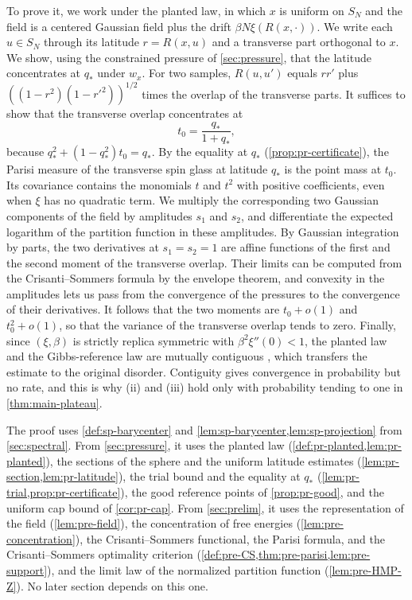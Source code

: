 To prove it, we work under the planted law, in which $x$ is uniform on $S_N$ and the field is a centered Gaussian field plus the drift $\beta N\xi(R(x,\cdot))$. We write each $u\in S_N$ through its latitude $r=R(x,u)$ and a transverse part orthogonal to $x$. We show, using the constrained pressure of \cref{sec:pressure}, that the latitude concentrates at $q_*$ under $w_x$. For two samples, $R(u,u')$ equals $rr'$ plus $((1-r^2)(1-r'^2))^{1/2}$ times the overlap of the transverse parts. It suffices to show that the transverse overlap concentrates at
\[
t_0=\frac{q_*}{1+q_*},
\]
because $q_*^2+(1-q_*^2)t_0=q_*$. By the equality at $q_*$ (\cref{prop:pr-certificate}), the Parisi measure of the transverse spin glass at latitude $q_*$ is the point mass at $t_0$. Its covariance contains the monomials $t$ and $t^2$ with positive coefficients, even when $\xi$ has no quadratic term. We multiply the corresponding two Gaussian components of the field by amplitudes $s_1$ and $s_2$, and differentiate the expected logarithm of the partition function in these amplitudes. By Gaussian integration by parts, the two derivatives at $s_1=s_2=1$ are affine functions of the first and the second moment of the transverse overlap. Their limits can be computed from the Crisanti--Sommers formula by the envelope theorem, and convexity in the amplitudes lets us pass from the convergence of the pressures to the convergence of their derivatives. It follows that the two moments are $t_0+o(1)$ and $t_0^2+o(1)$, so that the variance of the transverse overlap tends to zero. Finally, since $(\xi,\beta)$ is strictly replica symmetric with $\beta^2\xi''(0)<1$, the planted law and the Gibbs-reference law are mutually contiguous \cite[Lemma~3.2, Remark~3.3, and Corollary~3.5]{HuangMontanariPham2024}, which transfers the estimate to the original disorder. Contiguity gives convergence in probability but no rate, and this is why (ii) and (iii) hold only with probability tending to one in \cref{thm:main-plateau}.

The proof uses \cref{def:sp-barycenter} and \cref{lem:sp-barycenter,lem:sp-projection} from \cref{sec:spectral}. From \cref{sec:pressure}, it uses the planted law (\cref{def:pr-planted,lem:pr-planted}), the sections of the sphere and the uniform latitude estimates (\cref{lem:pr-section,lem:pr-latitude}), the trial bound and the equality at $q_*$ (\cref{lem:pr-trial,prop:pr-certificate}), the good reference points of \cref{prop:pr-good}, and the uniform cap bound of \cref{cor:pr-cap}. From \cref{sec:prelim}, it uses the representation of the field (\cref{lem:pre-field}), the concentration of free energies (\cref{lem:pre-concentration}), the Crisanti--Sommers functional, the Parisi formula, and the Crisanti--Sommers optimality criterion (\cref{def:pre-CS,thm:pre-parisi,lem:pre-support}), and the limit law of the normalized partition function (\cref{lem:pre-HMP-Z}). No later section depends on this one.

